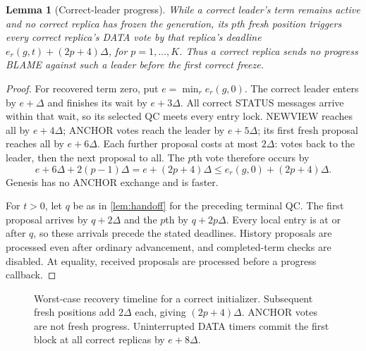 \documentclass[11pt,a4paper]{article}
\newtheorem{lemma}[lemma]{Lemma}
\begin{document}
\begin{lemma}[Correct-leader progress]
\label{lem:progress}
While a correct leader's term remains active and no correct replica has
frozen the generation, its $p$th fresh position triggers every correct
replica's DATA vote by that replica's deadline
$e_r(g,t)+(2p+4)\Delta$, for $p=1,\ldots,K$.
Thus a correct replica sends no progress BLAME against such a leader
before the first correct freeze.
\end{lemma}
\begin{proof}
For recovered term zero, put $e=\min_r e_r(g,0)$. The correct leader enters
by $e+\Delta$ and finishes its wait by $e+3\Delta$. All correct STATUS
messages arrive within that wait, so its selected QC meets every entry
lock. NEWVIEW reaches all by $e+4\Delta$; ANCHOR votes reach the leader
by $e+5\Delta$; its first fresh proposal reaches all by $e+6\Delta$.
Each further proposal costs at most $2\Delta$: votes back to the leader,
then the next proposal to all. The $p$th vote therefore occurs by
\[
 e+6\Delta+2(p-1)\Delta=e+(2p+4)\Delta
 \le e_r(g,0)+(2p+4)\Delta.
\]
Genesis has no ANCHOR exchange and is faster.

For $t>0$, let $q$ be as in \cref{lem:handoff} for the preceding terminal
QC. The first proposal arrives by $q+2\Delta$ and the $p$th by
$q+2p\Delta$. Every local entry is at or after $q$, so these arrivals
precede the stated deadlines. History proposals are processed even after
ordinary advancement, and completed-term checks are disabled. At equality,
received proposals are processed before a progress callback.
\end{proof}

\begin{figure}[htbp]\centering
{}
\caption{Worst-case recovery timeline for a correct initializer. Subsequent
fresh positions add $2\Delta$ each, giving $(2p+4)\Delta$. ANCHOR votes
are not fresh progress. Uninterrupted DATA timers commit the first block
at all correct replicas by $e+8\Delta$.}
\label{fig:recovery}
\end{figure}
\FloatBarrier
\end{document}
